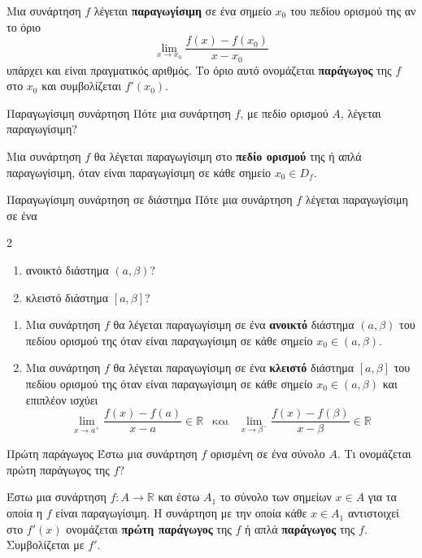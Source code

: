 \apanthsh
Μια συνάρτηση $ f $ λέγεται \textbf{παραγωγίσιμη} σε ένα σημείο $ x_0 $ του πεδίου ορισμού της αν το όριο
\[ \lim_{x\rightarrow x_0}{\frac{f(x)-f(x_0)}{x-x_0}} \]
υπάρχει και είναι πραγματικός αριθμός. Το όριο αυτό ονομάζεται \textbf{παράγωγος} της $ f $ στο $ x_0 $ και συμβολίζεται $ f'(x_0) $.
\begin{Orismosbox}{Παραγωγίσιμη συνάρτηση}
\label{orismos:paragwgisimh_synarthsh}
Πότε μια συνάρτηση $f$, με πεδίο ορισμού $A$, λέγεται παραγωγίσιμη?
\end{Orismosbox}
\apanthsh
Μια συνάρτηση $ f $ θα λέγεται παραγωγίσιμη στο \textbf{πεδίο ορισμού} της ή απλά παραγωγίσιμη, όταν είναι παραγωγίσιμη σε κάθε σημείο $ x_0\in D_f $.
\begin{Orismosbox}{Παραγωγίσιμη συνάρτηση σε διάστημα}
\label{orismos:paragwgisimh_se_diasthma}
Πότε μια συνάρτηση $f$ λέγεται παραγωγίσιμη σε ένα
\begin{multicols}{2}
\begin{enumerate}
\item ανοικτό διάστημα $(a,\beta)$?
\item κλειστό διάστημα $[a,\beta]$?
\end{enumerate}
\end{multicols}
\end{Orismosbox}
\apanthsh
\vspace{-7mm}
\begin{enumerate}
\item Μια συνάρτηση $ f $ θα λέγεται παραγωγίσιμη σε ένα \textbf{ανοικτό} διάστημα $ (a,\beta) $ του πεδίου ορισμού της όταν είναι παραγωγίσιμη σε κάθε σημείο $ x_0\in(a,\beta) $.
\item Μια συνάρτηση $ f $ θα λέγεται παραγωγίσιμη σε ένα \textbf{κλειστό} διάστημα $ [a,\beta] $ του πεδίου ορισμού της όταν είναι παραγωγίσιμη σε κάθε σημείο $ x_0\in(a,\beta) $ και επιπλέον ισχύει
\[ \lim_{x\to a^+}{\frac{f(x)-f(a)}{x-a}}\in\mathbb{R}\ \ \textrm{ και }\ \ \lim_{x\to \beta^-}{\frac{f(x)-f(\beta)}{x-\beta}}\in\mathbb{R} \]
\end{enumerate}
\begin{Orismosbox}{Πρώτη παράγωγος}
\label{orismos:prwth_paragwgos}
Έστω μια συνάρτηση $f$ ορισμένη σε ένα σύνολο $A$. Τι ονομάζεται πρώτη παράγωγος της $f$?
\end{Orismosbox}
\apanthsh
Έστω μια συνάρτηση $ f:Α\to\mathbb{R} $ και έστω $ A_1 $ το σύνολο των σημείων $ x\in A $ για τα οποία η $ f $ είναι παραγωγίσιμη. Η συνάρτηση με την οποία κάθε $ x\in A_1 $ αντιστοιχεί στο $ f'(x) $ ονομάζεται \textbf{πρώτη παράγωγος} της $ f $ ή απλά \textbf{παράγωγος} της $ f $. Συμβολίζεται με $ f' $.
